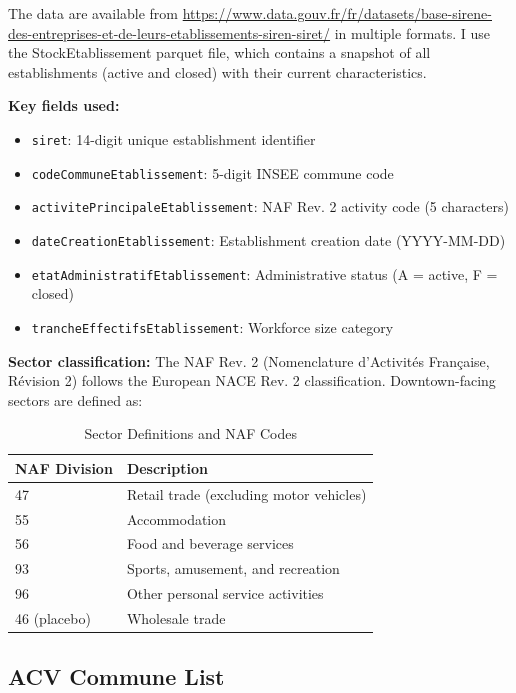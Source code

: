 \documentclass[12pt]{article}
\begin{document}
The data are available from \url{https://www.data.gouv.fr/fr/datasets/base-sirene-des-entreprises-et-de-leurs-etablissements-siren-siret/} in multiple formats. I use the StockEtablissement parquet file, which contains a snapshot of all establishments (active and closed) with their current characteristics.

\textbf{Key fields used:}
\begin{itemize}
    \item \texttt{siret}: 14-digit unique establishment identifier
    \item \texttt{codeCommuneEtablissement}: 5-digit INSEE commune code
    \item \texttt{activitePrincipaleEtablissement}: NAF Rev. 2 activity code (5 characters)
    \item \texttt{dateCreationEtablissement}: Establishment creation date (YYYY-MM-DD)
    \item \texttt{etatAdministratifEtablissement}: Administrative status (A = active, F = closed)
    \item \texttt{trancheEffectifsEtablissement}: Workforce size category
\end{itemize}

\textbf{Sector classification:} The NAF Rev. 2 (Nomenclature d'Activit\'es Fran\c{c}aise, R\'evision 2) follows the European NACE Rev. 2 classification. Downtown-facing sectors are defined as:

\begin{table}[H]
\centering
\caption{Sector Definitions and NAF Codes}
\label{tab:sectors}
\small
\begin{tabular}{ll}
\toprule
NAF Division & Description \\
\midrule
47 & Retail trade (excluding motor vehicles) \\
55 & Accommodation \\
56 & Food and beverage services \\
93 & Sports, amusement, and recreation \\
96 & Other personal service activities \\
\midrule
46 (placebo) & Wholesale trade \\
\bottomrule
\end{tabular}
\end{table}

\subsection{ACV Commune List}
\end{document}
